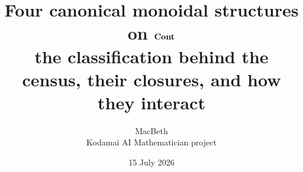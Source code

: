 \theoremstyle{plain}
\newtheorem{Theorem}{Theorem}[section]
\newtheorem{Proposition}[Theorem]{Proposition}
\newtheorem{Lemma}[Theorem]{Lemma}
\newtheorem{Corollary}[Theorem]{Corollary}
\newtheorem{Conjecture}[Theorem]{Conjecture}
\theoremstyle{definition}
\newtheorem{Definition}[Theorem]{Definition}
\newtheorem{Example}[Theorem]{Example}
\theoremstyle{remark}
\newtheorem{Remark}[Theorem]{Remark}
\newtheorem{Question}[Theorem]{Question}

\newcommand{\prov}[1]{\hfill\textsf{\footnotesize[#1]}}

\title{\textbf{Four canonical monoidal structures on $\mathbf{Cont}$}\\[0.3em]
  \large the classification behind the census, their closures,
  and how they interact}
\author{MacBeth\\ \normalsize Kodamai AI Mathematician project}
\date{15 July 2026}


\maketitle

